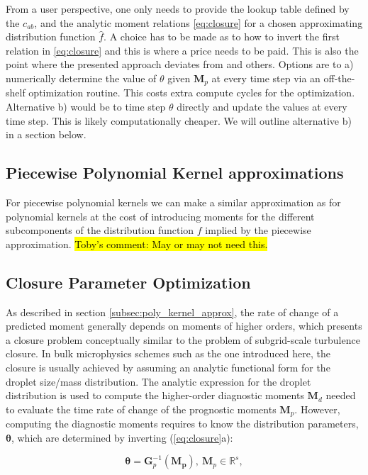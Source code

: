 \documentclass{report}
\begin{document}
From a user perspective, one only needs to provide the lookup table defined by the $c_{ab}$, and the analytic moment relations \eqref{eq:closure} for a chosen approximating distribution function $\hat{f}$. A choice has to be made as to how to invert the first relation in \eqref{eq:closure} and this is where a price needs to be paid. This is also the point where the presented approach deviates from \cite{Beheng01} and others. Options are to a) numerically determine the value of $\theta$ given $\mathbf{M}_p$ at every time step via an off-the-shelf optimization routine. This costs extra compute cycles for the optimization. Alternative b) would be to time step $\theta$ directly and update the values at every time step. This is likely computationally cheaper. We will outline alternative b) in a section below.

\subsection{Piecewise Polynomial Kernel approximations}
For piecewise polynomial kernels we can make a similar approximation as for polynomial kernels at the cost of introducing moments for the different subcomponents of the distribution function $f$ implied by the piecewise approximation. \hl{Toby's comment: May or may not need this.}

\subsection{Closure Parameter Optimization}
As described in section \ref{subsec:poly_kernel_approx}, the rate of change of a predicted moment
generally depends on moments of higher orders, which presents a closure problem conceptually
similar to the problem of subgrid-scale turbulence closure. 
In bulk microphysics schemes such as the one introduced here, the closure is usually achieved by assuming an
analytic functional form for the droplet size/mass distribution. The analytic expression for the droplet distribution is used to compute the higher-order diagnostic moments $\mathbf{M}_d$ needed to evaluate the time rate of change of the prognostic moments $\mathbf{M}_p$. However, computing the diagnostic moments requires to know the distribution parameters, $\mathbf{\theta}$, which are determined by inverting (\ref{eq:closure}a):

\begin{equation}\label{eq:Mp_to_param}
\mathbf{\theta} = \mathbf{G}_p^{-1}(\mathbf{{M}_p}), ~ \mathbf{M}_p \in \mathbb{R}^s, 
\end{equation}
\end{document}
